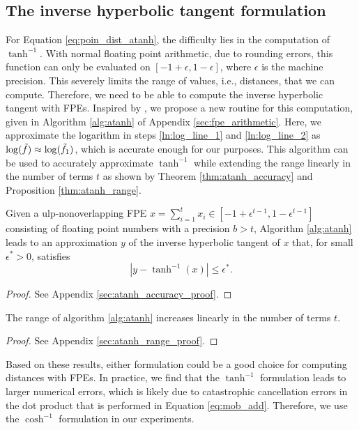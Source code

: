 \subsection{The inverse hyperbolic tangent formulation}
For Equation \ref{eq:poin_dist_atanh}, the difficulty lies in the computation of $\tanh^{-1}$. With normal floating point arithmetic, due to rounding errors, this function can only be evaluated on $[-1 + \epsilon, 1 - \epsilon]$, where $\epsilon$ is the machine precision. This severely limits the range of values, i.e., distances, that we can compute. Therefore, we need to be able to compute the inverse hyperbolic tangent with FPEs. Inspired by \citep{felker2024musl}, we propose a new routine for this computation, given in Algorithm \ref{alg:atanh} of Appendix \ref{sec:fpe_arithmetic}. Here, we approximate the logarithm in steps \ref{ln:log_line_1} and \ref{ln:log_line_2} as $\log(\tilde{f}) \approx \log(\tilde{f}_1)$, which is accurate enough for our purposes. This algorithm can be used to accurately approximate $\tanh^{-1}$ while extending the range linearly in the number of terms $t$ as shown by Theorem \ref{thm:atanh_accuracy} and Proposition \ref{thm:atanh_range}.



\begin{theorem}\label{thm:atanh_accuracy}
    Given a ulp-nonoverlapping FPE $x = \sum_{i=1}^t x_i \in [-1 + \epsilon^{t - 1}, 1 - \epsilon^{t - 1}]$ consisting of floating point numbers with a precision $b > t$, Algorithm \ref{alg:atanh} leads to an approximation $y$ of the inverse hyperbolic tangent of $x$ that, for small $\epsilon^* > 0$, satisfies
    \begin{equation}
        |y - \tanh^{-1} (x)| \leq \epsilon^*.
    \end{equation}
\end{theorem}
\vspace{-0.4cm}
\begin{proof}
    See Appendix \ref{sec:atanh_accuracy_proof}.
\end{proof}
\vspace{-0.2cm}

\begin{proposition}\label{thm:atanh_range}
    The range of algorithm \ref{alg:atanh} increases linearly in the number of terms $t$.
\end{proposition}
\vspace{-0.4cm}
\begin{proof}
    See Appendix \ref{sec:atanh_range_proof}.
\end{proof}
\vspace{-0.2cm}
Based on these results, either formulation could be a good choice for computing distances with FPEs. In practice, we find that the $\tanh^{-1}$ formulation leads to larger numerical errors, which is likely due to catastrophic cancellation errors in the dot product that is performed in Equation \ref{eq:mob_add}. Therefore, we use the $\cosh^{-1}$ formulation in our experiments.


